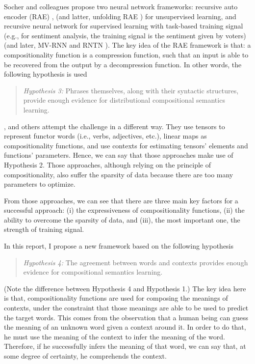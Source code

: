 \documentclass[10pt]{article}
\begin{document}
Socher and colleagues propose two neural network frameworks: recursive auto encoder (RAE) 
\citep{socher_semi-supervised_2011}, (and latter, unfolding RAE \citep{socher_dynamic_2011}) for 
unsupervised learning, and recursive neural network for supervised learning with task-based 
training signal \citep{socher_learning_2010}
(e.g., for sentiment analysis, the training signal is the sentiment given by voters)
(and later, MV-RNN \citep{socher_semantic_2012} and RNTN \citep{socher2013recursive}). 
The key idea of the RAE framework is that: a compositionality function is a compression function, 
such that an input is able to be recovered from the output by a decompression function. 
In other words, the following hypothesis is used 
\begin{quote}
\textit{Hypothesis 3:} Phrases themselves, along with their syntactic structures, 
provide enough evidence for distributional compositional 
semantics learning.
\end{quote}

\cite{baroni_frege_2012}, \cite{grefenstette_multi-step_2013} and others attempt the challenge 
in a different way. 
They use tensors to represent functor words (i.e., verbs, adjectives, etc.), 
linear maps as compositionality functions, and use contexts for estimating tensors' elements and 
functions' parameters. Hence, we can say that those approaches make use of Hypothesis 2. 
Those approaches, although relying on the principle of compositionality, also suffer 
the sparsity of data because there are too many parameters to optimize. 

From those approaches, we can see that there are three main key factors for a successful 
approach: (i) the expressiveness of compositionality functions, (ii) the ability to overcome 
the sparsity of data, and (iii), the most important one, the strength of training signal. 

In this report, I propose a new framework based on the following hypothesis
\begin{quote}
\textit{Hypothesis 4:} The agreement between words and contexts provides enough evidence
for compositional semantics learning. 
\end{quote}
(Note the difference between Hypothesis 4 and Hypothesis 1.) The key idea here is that, 
compositionality functions are used for composing the meanings of contexts, under the 
constraint that those meanings are able to be used to predict the target words. This 
comes from the observation that a human being can guess the meaning of an unknown
word given a context around it. In order to do that, he must use the meaning of the context
to infer the meaning of the word. Therefore, if he successfully infers the meaning of that
word, we can say that, at some degree of certainty, he comprehends the context. 
\end{document}
